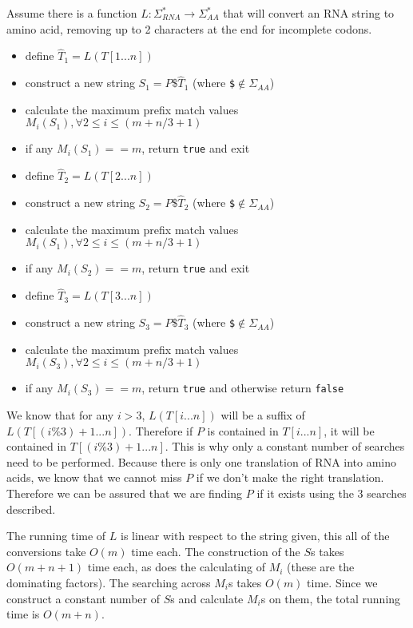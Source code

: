 \documentclass[11pt, oneside]{article}   	%
\begin{document}
\begin{enumerate}
Assume there is a function $L: \Sigma_{RNA}^*\rightarrow\Sigma_{AA}^*$ that will convert an RNA string to amino acid, removing up to 2 characters at the end for incomplete codons. 
\begin{itemize}
\item define $\hat{T}_1 = L(T[1...n])$
\item construct a new string $S_1 = P\texttt{\$}\hat{T}_1$ (where \texttt{\$}$\notin\Sigma_{AA}$)
\item calculate the maximum prefix match values $M_i(S_1), \forall 2 \le i \le (m+n/3+1)$
\item if any $M_i(S_1) == m$, return \texttt{true} and exit
\item define $\hat{T}_2 = L(T[2...n])$
\item construct a new string $S_2 = P\texttt{\$}\hat{T}_2$ (where \texttt{\$}$\notin\Sigma_{AA}$)
\item calculate the maximum prefix match values $M_i(S_1), \forall 2 \le i \le (m+n/3+1)$
\item if any $M_i(S_2) == m$, return \texttt{true} and exit
\item define $\hat{T}_3 = L(T[3...n])$
\item construct a new string $S_3 = P\texttt{\$}\hat{T}_3$ (where \texttt{\$}$\notin\Sigma_{AA}$)
\item calculate the maximum prefix match values $M_i(S_3), \forall 2 \le i \le (m+n/3+1)$
\item if any $M_i(S_3) == m$, return \texttt{true} and otherwise return \texttt{false}
\end{itemize}

We know that for any $i > 3$, $L(T[i...n])$ will be a suffix of $L(T[(i\%3)+1...n])$. 
Therefore if $P$ is contained in $T[i...n]$, it will be contained in $T[(i\%3)+1...n]$.
This is why only a constant number of searches need to be performed. 
Because there is only one translation of RNA into amino acids, we know that we cannot miss $P$ if we don't make the right translation. 
Therefore we can be assured that we are finding $P$ if it exists using the 3 searches described. 

The running time of $L$ is linear with respect to the string given, this all of the conversions take $O(m)$ time each. 
The construction of the $S$s takes $O(m+n+1)$ time each, as does the calculating of $M_i$ (these are the dominating factors).
The searching across $M_i$s takes $O(m)$ time. 
Since we construct a constant number of $S$s and calculate $M_i$s on them, the total running time is $O(m+n)$. 


\end{enumerate}
\end{document}
